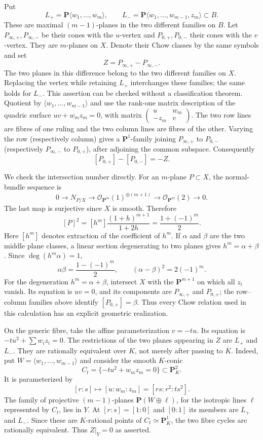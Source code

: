 \documentclass[11pt,a4paper]{article}
\begin{document}
Put
\[
 L_+=\mathbf P\langle w_1,\ldots,w_m\rangle,\qquad
 L_-=\mathbf P\langle w_1,\ldots,w_{m-1},z_m\rangle
       \subset B.
\]
These are maximal $(m-1)$-planes in the two different families on $B$.
Let $P_{\infty,+},P_{\infty,-}$ be their cones with the $u$-vertex and
$P_{0,+},P_{0,-}$ their cones with the $v$-vertex. They are $m$-planes on
$X$. Denote their Chow classes by the same symbols and set
\[
 Z=P_{\infty,+}-P_{\infty,-}.
\]
The two planes in this difference belong to the two different families on
$X$. Replacing the vertex while retaining $L_+$ interchanges these families;
the same holds for $L_-$. This assertion can be checked without a
classification theorem. Quotient by
$\langle w_1,\ldots,w_{m-1}\rangle$ and use the rank-one matrix description
of the quadric surface $uv+w_mz_m=0$, with matrix
$\left(\begin{smallmatrix}u&w_m\\-z_m&v\end{smallmatrix}\right)$.
The two row lines are fibres of one ruling and the two column lines are
fibres of the other. Varying the row (respectively column) gives a
$\mathbf P^1$-family joining $P_{\infty,+}$ to $P_{0,-}$ (respectively
$P_{\infty,-}$ to $P_{0,+}$), after adjoining the common subspace.
Consequently
\[
 [P_{0,+}]-[P_{0,-}]=-Z.
\]

We check the intersection number directly. For an $m$-plane $P\subset X$,
the normal-bundle sequence is
\[
 0\longrightarrow N_{P/X}\longrightarrow
 \mathcal O_{\mathbf P^m}(1)^{\oplus(m+1)}
 \longrightarrow\mathcal O_{\mathbf P^m}(2)\longrightarrow0.
\]
The last map is surjective since $X$ is smooth. Therefore
\[
 [P]^2=[h^m]\frac{(1+h)^{m+1}}{1+2h}
       =\frac{1+(-1)^m}{2}.
\]
Here $[h^m]$ denotes extraction of the coefficient of $h^m$. If $\alpha$
and $\beta$ are the two middle plane classes, a linear section degenerating
to two planes gives $h^m=\alpha+\beta$. Since $\deg(h^m\alpha)=1$,
\[
 \alpha\beta=\frac{1-(-1)^m}{2},\qquad
 (\alpha-\beta)^2=2(-1)^m.
\]
For the degeneration $h^m=\alpha+\beta$, intersect $X$ with the
$\mathbf P^{m+1}$ on which all $z_i$ vanish. Its equation is $uv=0$, and
its components are $P_{\infty,+}$ and $P_{0,+}$; the row--column families
above identify $[P_{0,+}]=\beta$. Thus every Chow relation used in this
calculation has an explicit geometric realization.

On the generic fibre, take the affine parameterization $v=-t u$. Its
equation is $-t u^2+\sum w_i z_i=0$. The restrictions of the two planes
appearing in $Z$ are $L_+$ and $L_-$. They are rationally equivalent over
$K$, not merely after passing to $\overline K$. Indeed, put
$W=\langle w_1,\ldots,w_{m-1}\rangle$ and consider the smooth $K$-conic
\[
 C_t=\{-t u^2+w_mz_m=0\}\subset\mathbf P^2_K.
\]
It is parameterized by
\[
 [r:s]\longmapsto[u:w_m:z_m]=[rs:r^2:t s^2].
\]
The family of projective $(m-1)$-planes
$\mathbf P(W\oplus\ell)$, for the isotropic lines $\ell$ represented by
$C_t$, lies in $Y$. At $[r:s]=[1:0]$ and $[0:1]$ its members are $L_+$
and $L_-$. Since these are $K$-rational points of $C_t\simeq\mathbf P^1_K$,
the two fibre cycles are rationally equivalent. Thus $Z|_Y=0$ as asserted.
\end{document}
